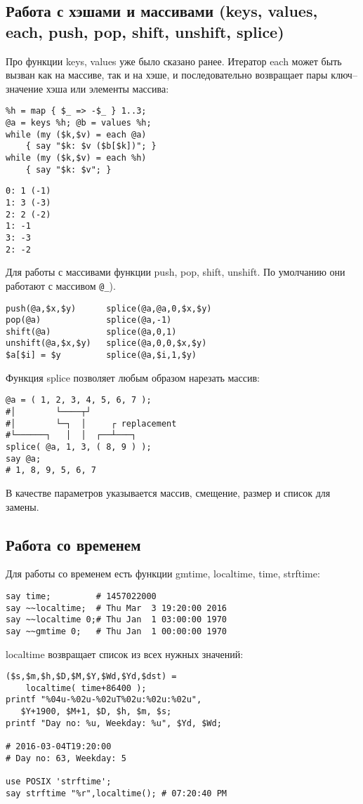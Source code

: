 \subsection{Работа с хэшами  и массивами (keys, values, each,
  push, pop, shift, unshift, splice)}
Про функции keys, values уже было сказано ранее. Итератор each может быть вызван как на массиве, так и на хэше, и последовательно возвращает пары ключ--значение хэша или элементы массива:
\begin{verbatim}
%h = map { $_ => -$_ } 1..3;
@a = keys %h; @b = values %h;
while (my ($k,$v) = each @a)
    { say "$k: $v ($b[$k])"; }
while (my ($k,$v) = each %h)
    { say "$k: $v"; }
\end{verbatim}
\begin{verbatim}
0: 1 (-1)
1: 3 (-3)
2: 2 (-2)
1: -1
3: -3
2: -2
\end{verbatim}

Для работы с массивами функции push, pop, shift, unshift. По умолчанию они работают с массивом \verb|@_|).
\begin{verbatim}
push(@a,$x,$y)      splice(@a,@a,0,$x,$y)
pop(@a)             splice(@a,-1)
shift(@a)           splice(@a,0,1)
unshift(@a,$x,$y)   splice(@a,0,0,$x,$y)
$a[$i] = $y         splice(@a,$i,1,$y)
\end{verbatim}
Функция splice позволяет любым образом нарезать массив:
\begin{verbatim}
@a = ( 1, 2, 3, 4, 5, 6, 7 );
#│        └────┬┘
#│        └─┐  │     ┌ replacement
#└──────┐   │  │  ┌──┴───┐
splice( @a, 1, 3, ( 8, 9 ) );
say @a;
# 1, 8, 9, 5, 6, 7
\end{verbatim}
В качестве параметров указывается массив, смещение, размер и список для замены.

\subsection{Работа со временем}
Для работы со временем есть функции gmtime, localtime, time, strftime:
\begin{verbatim}
say time;         # 1457022000
say ~~localtime;  # Thu Mar  3 19:20:00 2016
say ~~localtime 0;# Thu Jan  1 03:00:00 1970
say ~~gmtime 0;   # Thu Jan  1 00:00:00 1970
\end{verbatim}
localtime возвращает список из всех нужных значений:
\begin{verbatim}
($s,$m,$h,$D,$M,$Y,$Wd,$Yd,$dst) =
    localtime( time+86400 );
printf "%04u-%02u-%02uT%02u:%02u:%02u",
   $Y+1900, $M+1, $D, $h, $m, $s;
printf "Day no: %u, Weekday: %u", $Yd, $Wd;

# 2016-03-04T19:20:00
# Day no: 63, Weekday: 5

use POSIX 'strftime';
say strftime "%r",localtime(); # 07:20:40 PM
\end{verbatim}

